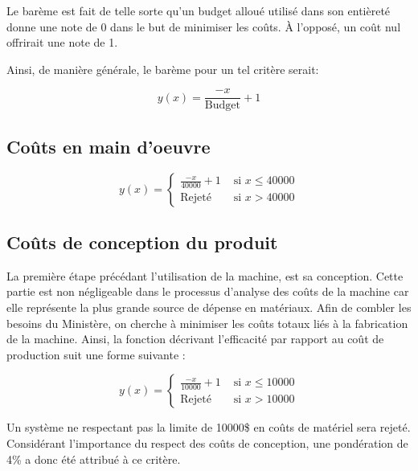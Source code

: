 Le barème est fait de telle sorte qu'un budget alloué utilisé dans son entièreté donne une note de 0 dans le but de minimiser les coûts. À l'opposé, un coût nul offrirait une note de 1.

Ainsi, de manière générale, le barème pour un tel critère serait:

\begin{equation}
    y(x)=\frac{-x}{\text{Budget}} + 1
\end{equation}

\subsection{Coûts en main d'oeuvre}

\begin{equation}
y(x) = \begin{cases}
        \frac{-x}{40000} + 1 & \text{ si } x \leq 40000\\
        \text{Rejeté} & \text{ si } x > 40000
    \end{cases}
    \label{eq:bareme_cout_logiciel}
\end{equation}

\subsection{Coûts de conception du produit}

La première étape précédant l’utilisation de la machine, est sa conception. Cette partie est non négligeable dans le processus d’analyse des coûts de la machine car elle représente la plus grande source de dépense en matériaux. Afin de combler les besoins du Ministère, on cherche à minimiser les coûts totaux liés à la fabrication de la machine. %
Ainsi, la fonction décrivant l’efficacité par rapport au coût de production suit une forme suivante :

\begin{equation}
y(x) = \begin{cases}
        \frac{-x}{10000} + 1 & \text{ si } x \leq 10000\\
        \text{Rejeté} & \text{ si } x > 10000
    \end{cases}
    \label{eq:bareme_cout_materiel}
\end{equation}

Un système ne respectant pas la limite de 10000\$ en coûts de matériel sera rejeté. Considérant l'importance du respect des coûts de conception, une pondération de 4\% a donc été attribué à ce critère.


